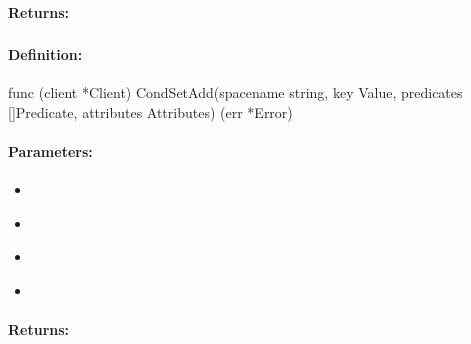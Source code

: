 \paragraph{Returns:}


\pagebreak
\subsubsection{}
\label{api:Go:CondSetAdd}


\paragraph{Definition:}
\begin{gocode}
func (client *Client) CondSetAdd(spacename string, key Value, predicates []Predicate, attributes Attributes) (err *Error)
\end{gocode}

\paragraph{Parameters:}
\begin{itemize}[noitemsep]
\item {}\\

\item {}\\

\item {}\\

\item {}\\

\end{itemize}

\paragraph{Returns:}


\pagebreak
\subsubsection{}
\label{api:Go:SetRemove}


